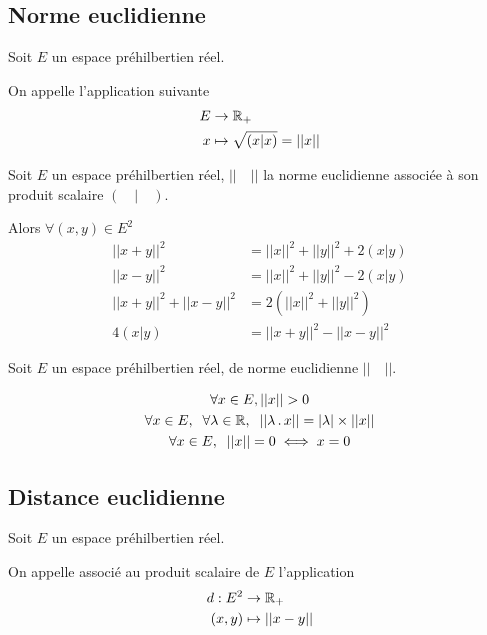 \subsection{Norme euclidienne}

\begin{dfn}
Soit $E$ un espace préhilbertien réel.

On appelle  l'application suivante
\begin{align*}
    E &\to \mathbb{R}_+ \\
    x &\mapsto \sqrt{(x|x)} = ||x||
\end{align*}
\end{dfn}

\begin{prp}
Soit $E$ un espace préhilbertien réel, $||\quad||$ la norme euclidienne
associée à son produit scalaire $(\quad|\quad)$.

Alors $\forall (x, y) \in E^2$
\begin{align*}
    ||x + y||^2 &= ||x||^2 + ||y||^2 + 2(x|y) \\
    ||x - y||^2 &= ||x||^2 + ||y||^2 - 2(x|y) \\
    ||x + y||^2 + ||x - y||^2 &= 2 (||x||^2 + ||y||^2) \\
    4 (x|y) &= ||x + y||^2 - ||x - y||^2
\end{align*}
\end{prp}

\begin{prp}
Soit $E$ un espace préhilbertien réel, de norme euclidienne $||\quad||$.

\begin{gather*}
    \forall x \in E, ||x|| > 0 \\
    \forall x \in E, \;\; \forall \lambda \in \mathbb{R}, \;\;  ||\lambda \operatorname{.} x|| =
        |\lambda| \times ||x|| \\
    \forall x \in E, \;\; ||x|| = 0 \iff x = 0
\end{gather*}
\end{prp}


\subsection{Distance euclidienne}

\begin{dfn}
Soit $E$ un espace préhilbertien réel.

On appelle  associé au produit scalaire de $E$
l'application
\begin{align*}
    d : E^2 &\to \mathbb{R}_+ \\
        (x, y) &\mapsto || x - y ||
\end{align*}
\end{dfn}

